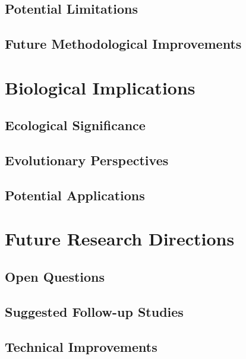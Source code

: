 \documentclass[
  11pt,
  a4paper,
]{report}
\begin{document}
\subsection{Potential Limitations}\label{potential-limitations}

\subsection{Future Methodological
Improvements}\label{future-methodological-improvements}

\section{Biological Implications}\label{biological-implications}

\subsection{Ecological Significance}\label{ecological-significance}

\subsection{Evolutionary Perspectives}\label{evolutionary-perspectives}

\subsection{Potential Applications}\label{potential-applications}

\section{Future Research Directions}\label{future-research-directions}

\subsection{Open Questions}\label{open-questions}

\subsection{Suggested Follow-up
Studies}\label{suggested-follow-up-studies}

\subsection{Technical Improvements}\label{technical-improvements}
\end{document}
